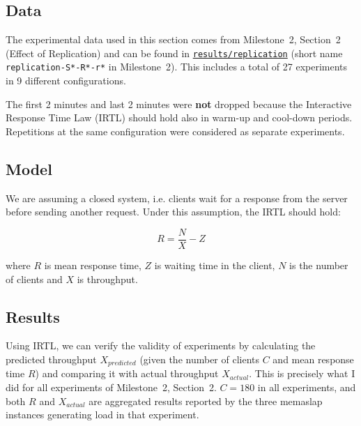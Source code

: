 \documentclass[11pt]{article}
\begin{document}
\subsection{Data}

The experimental data used in this section comes from Milestone~2, Section~2 (Effect of Replication) and can be found in \texttt{\href{https://gitlab.inf.ethz.ch/pungast/asl-fall16-project/tree/master/results/replication}{results/replication}} (short name \texttt{replication-S*-R*-r*} in Milestone~2). This includes a total of 27 experiments in 9 different configurations.

The first 2 minutes and last 2 minutes were \textbf{not} dropped because the Interactive Response Time Law (IRTL) should hold also in warm-up and cool-down periods. Repetitions at the same configuration were considered as separate experiments.

\subsection{Model}

We are assuming a closed system, i.e. clients wait for a response from the server before sending another request. Under this assumption, the IRTL should hold:

$$R = \frac{N}{X} - Z$$

where $R$ is mean response time, $Z$ is waiting time in the client, $N$ is the number of clients and $X$ is throughput.

\subsection{Results}

Using IRTL, we can verify the validity of experiments by calculating the predicted throughput $X_{predicted}$ (given the number of clients $C$ and mean response time $R$) and comparing it with actual throughput $X_{actual}$. This is precisely what I did for all experiments of Milestone~2, Section~2. $C=180$ in all experiments, and both $R$ and $X_{actual}$ are aggregated results reported by the three memaslap instances generating load in that experiment.
\end{document}
